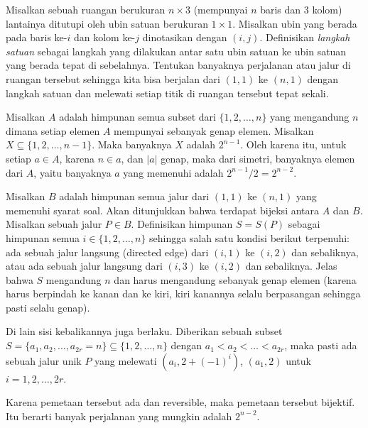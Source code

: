 \documentclass[11pt]{scrartcl}
\begin{document}
\begin{soaljawab}
    Misalkan sebuah ruangan berukuran $n \times 3$ (mempunyai $n$ baris dan $3$ kolom) lantainya ditutupi oleh ubin satuan berukuran $1 \times 1$. Misalkan ubin yang berada pada baris ke-$i$ dan kolom ke-$j$ dinotasikan dengan $(i,j)$. Definisikan \textit{langkah satuan} sebagai langkah yang dilakukan antar satu ubin satuan ke ubin satuan yang berada tepat di sebelahnya. Tentukan banyaknya perjalanan atau jalur di ruangan tersebut sehingga kita bisa berjalan dari $(1,1)$ ke $(n,1)$ dengan langkah satuan dan melewati setiap titik di ruangan tersebut tepat sekali.
    \begin{solusi}
        Misalkan $A$ adalah himpunan semua subset dari $\{1,2,\dots,n\}$ yang mengandung $n$ dimana setiap elemen $A$ mempunyai sebanyak genap elemen. Misalkan $X \subseteq \{1,2,\dots,n-1\}$.  Maka banyaknya $X$ adalah $2^{n-1}$. Oleh karena itu, untuk setiap $a \in A$, karena $n \in a$, dan $|a|$ genap, maka dari simetri, banyaknya elemen dari  $A$, yaitu banyaknya $a$ yang memenuhi adalah $2^{n-1}/2=2^{n-2}$.

        Misalkan $B$ adalah himpunan semua jalur dari $(1,1)$ ke $(n,1)$ yang memenuhi syarat soal. Akan ditunjukkan bahwa terdapat bijeksi antara $A$ dan $B$. Misalkan sebuah jalur $P \in B$. Definisikan himpunan $S=S(P)$ sebagai himpunan semua $i \in \{1,2,\dots,n\}$ sehingga salah satu kondisi berikut terpenuhi: ada sebuah jalur langsung (directed  edge) dari  $(i,1)$ ke $(i,2)$ dan sebaliknya, atau ada sebuah jalur langsung dari $(i,3)$ ke $(i,2)$ dan sebaliknya. Jelas bahwa $S$ mengandung $n$ dan harus mengandung sebanyak genap elemen (karena harus berpindah ke kanan dan ke kiri, kiri kanannya selalu berpasangan sehingga pasti selalu genap).

        Di lain sisi kebalikannya juga berlaku. Diberikan sebuah subset $S=\{a_1,a_2,\dots,a_{2r}=n\} \subseteq \{1,2,\dots,n\}$ dengan $a_1<a_2<\dots<a_{2r}$, maka pasti ada sebuah jalur unik $P$ yang melewati $(a_i, 2+(-1)^i)$, $(a_1,2)$ untuk $i=1,2,\dots,2r$.

        Karena pemetaan tersebut ada dan reversible, maka pemetaan tersebut bijektif. Itu berarti banyak perjalanan yang mungkin adalah $2^{n-2}$.
    \end{solusi}
\end{soaljawab}
\end{document}

